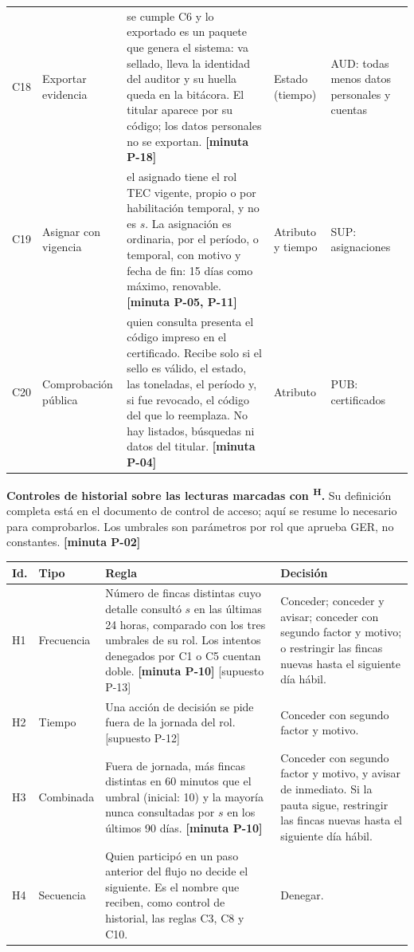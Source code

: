 \documentclass[11pt,letterpaper]{article}
\newcommand{\cab}[1]{\textbf{\rmfamily #1}}
\newcommand{\resp}[1]{\textrm{\footnotesize\bfseries [minuta #1]}}
\newcommand{\supu}[1]{\textrm{\footnotesize [supuesto #1]}}
\newcommand{\cnd}[1]{\textsuperscript{\rmfamily\bfseries #1}}   %
\begin{document}
{\begin{longtable}{@{}L{0.8cm} L{2.5cm} L{8.0cm} L{1.7cm} L{1.95cm}@{}}
C18 & Exportar evidencia &
se cumple C6 y lo exportado es un paquete que genera el sistema: va sellado, lleva la identidad del
auditor y su huella queda en la bitácora. El titular aparece por su código; los datos personales no
se exportan. \resp{P-18} &
Estado (tiempo) &
AUD: todas menos datos personales y cuentas \\

C19 & Asignar con vigencia &
el asignado tiene el rol TEC vigente, propio o por habilitación temporal, y no es $s$. La asignación
es ordinaria, por el período, o temporal, con motivo y fecha de fin: 15 días como máximo, renovable.
\resp{P-05, P-11} &
Atributo y tiempo &
SUP: asignaciones \\

C20 & Comprobación pública &
quien consulta presenta el código impreso en el certificado. Recibe solo si el sello es válido, el
estado, las toneladas, el período y, si fue revocado, el código del que lo reemplaza. No hay
listados, búsquedas ni datos del titular. \resp{P-04} &
Atributo &
PUB: certificados \\
\end{longtable}
}

\textbf{Controles de historial sobre las lecturas marcadas con \cnd{H}.} Su definición completa está en el
documento de control de acceso; aquí se resume lo necesario para comprobarlos. Los umbrales son
parámetros por rol que aprueba GER, no constantes. \resp{P-02}

{\small
\renewcommand{\arraystretch}{1.25}
\begin{tabularx}{\textwidth}{@{}L{0.75cm} L{2.0cm} Y L{4.6cm}@{}}
\toprule
\cab{Id.} & \cab{Tipo} & \cab{Regla} & \cab{Decisión} \\
\midrule
H1 & Frecuencia &
Número de fincas distintas cuyo detalle consultó $s$ en las últimas 24 horas, comparado con los tres
umbrales de su rol. Los intentos denegados por C1 o C5 cuentan doble. \resp{P-10} \supu{P-13} &
Conceder; conceder y avisar; conceder con segundo factor y motivo; o restringir las fincas nuevas
hasta el siguiente día hábil. \\
H2 & Tiempo &
Una acción de decisión se pide fuera de la jornada del rol. \supu{P-12} &
Conceder con segundo factor y motivo. \\
H3 & Combinada &
Fuera de jornada, más fincas distintas en 60 minutos que el umbral (inicial: 10) y la mayoría nunca
consultadas por $s$ en los últimos 90 días. \resp{P-10} &
Conceder con segundo factor y motivo, y avisar de inmediato. Si la pauta sigue, restringir las
fincas nuevas hasta el siguiente día hábil. \\
H4 & Secuencia &
Quien participó en un paso anterior del flujo no decide el siguiente. Es el nombre que reciben, como
control de historial, las reglas C3, C8 y C10. &
Denegar. \\
\bottomrule
\end{tabularx}
}
\end{document}
